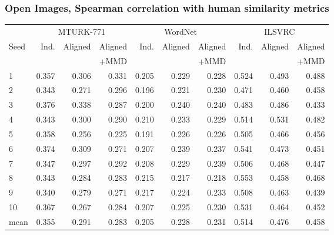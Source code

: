 \subsubsection{Open Images, Spearman correlation with human similarity metrics}
\begin{table}[H]
\centering
\begin{tabular}{lrrrrrrrrr}
  \toprule

\multicolumn{1}{r}{} & \multicolumn{3}{c}{MTURK-771} & \multicolumn{3}{c}{WordNet} & \multicolumn{3}{c}{ILSVRC} \\
\cmidrule(lr){2-4} \cmidrule(lr){5-7} \cmidrule(lr){8-10}
{Seed} &  Ind. &   Aligned &  Aligned  & Ind. &   Aligned &  Aligned  & Ind. &   Aligned &  Aligned   \\
{}     &              &           & +MMD      &            &            & +MMD      &             &           &   +MMD \\
\midrule
1    &     0.357 &  0.306 &   0.331 &     0.205 &  0.229 &    0.228 &   0.524 &  0.493 &  0.488  \\
2    &     0.343 &  0.271 &   0.296 &     0.196 &  0.221 &    0.230 &   0.471 &  0.460 &  0.458  \\
3    &     0.376 &  0.338 &   0.287 &     0.200 &  0.240 &    0.240 &   0.483 &  0.486 &  0.433  \\
4    &     0.343 &  0.300 &   0.290 &     0.210 &  0.233 &    0.229 &   0.514 &  0.531 &  0.482 \\
5    &     0.358 &  0.256 &   0.225 &     0.191 &  0.226 &    0.226 &   0.505 &  0.466 &  0.456  \\
6    &     0.374 &  0.309 &   0.271 &     0.207 &  0.239 &    0.237 &   0.541 &  0.473 &  0.451  \\
7    &     0.347 &  0.297 &   0.292 &     0.208 &  0.229 &    0.239 &   0.506 &  0.468 &  0.447  \\
8    &     0.343 &  0.284 &   0.283 &     0.215 &  0.217 &    0.218 &   0.553 &  0.458 &  0.468  \\
9    &     0.340 &  0.279 &   0.271 &     0.217 &  0.224 &    0.233 &   0.508 &  0.463 &  0.439  \\
10   &     0.367 &  0.267 &   0.284 &     0.207 &  0.225 &    0.230 &   0.531 &  0.464 &  0.452  \\
\midrule                                                                                         
mean &     0.355 &  0.291 &   0.283 &     0.205 &  0.228 &    0.231 &   0.514 &  0.476 &  0.458  \\
\bottomrule
\end{tabular}
\end{table}

